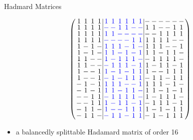 \documentclass{beamer}
\newcommand{\bblue}[1]{\textcolor{blue}{#1}}
\begin{document}
\begin{frame}{Hadmard Matrices}

  \[
    \arraycolsep=1.0pt\def\arraystretch{0.75}
    \left(\begin{array}{cccc|cccccc|cccccc}
            1&1&1&1&\bblue{1}&\bblue{1}&\bblue{1}&\bblue{1}&\bblue{1}&\bblue{1}&-&-&-&-&-&-\\
            1&1&1&1&\bblue{-}&\bblue{-}&\bblue{1}&\bblue{1}&\bblue{-}&\bblue{-}&1&1&-&-&1&1\\
            1&1&1&1&\bblue{1}&\bblue{1}&\bblue{-}&\bblue{-}&\bblue{-}&\bblue{-}&-&-&1&1&1&1\\
            1&1&1&1&\bblue{-}&\bblue{-}&\bblue{-}&\bblue{-}&\bblue{1}&\bblue{1}&1&1&1&1&-&-\\
            1&-&1&-&\bblue{1}&\bblue{1}&\bblue{1}&\bblue{-}&\bblue{1}&\bblue{-}&1&1&1&-&-&1\\
            1&-&1&-&\bblue{1}&\bblue{1}&\bblue{-}&\bblue{1}&\bblue{-}&\bblue{1}&1&1&-&1&1&-\\
            1&1&-&-&\bblue{1}&\bblue{-}&\bblue{1}&\bblue{1}&\bblue{1}&\bblue{-}&-&1&1&1&1&-\\
            1&1&-&-&\bblue{-}&\bblue{1}&\bblue{1}&\bblue{1}&\bblue{-}&\bblue{1}&1&-&1&1&-&1\\
            1&-&-&1&\bblue{1}&\bblue{-}&\bblue{1}&\bblue{-}&\bblue{1}&\bblue{1}&1&-&-&1&1&1\\
            1&-&-&1&\bblue{-}&\bblue{1}&\bblue{-}&\bblue{1}&\bblue{1}&\bblue{1}&-&1&1&-&1&1\\
            -&1&-&1&\bblue{1}&\bblue{1}&\bblue{1}&\bblue{-}&\bblue{-}&\bblue{1}&1&1&1&-&1&-\\
            -&1&-&1&\bblue{1}&\bblue{1}&\bblue{-}&\bblue{1}&\bblue{1}&\bblue{-}&1&1&-&1&-&1\\
            -&-&1&1&\bblue{-}&\bblue{1}&\bblue{1}&\bblue{1}&\bblue{1}&\bblue{-}&1&-&1&1&1&-\\
            -&-&1&1&\bblue{1}&\bblue{-}&\bblue{1}&\bblue{1}&\bblue{-}&\bblue{1}&-&1&1&1&-&1\\
            -&1&1&-&\bblue{1}&\bblue{-}&\bblue{-}&\bblue{1}&\bblue{1}&\bblue{1}&1&-&1&-&1&1\\
            -&1&1&-&\bblue{-}&\bblue{1}&\bblue{1}&\bblue{-}&\bblue{1}&\bblue{1}&-&1&-&1&1&1\\
          \end{array}\right)
      \]

      \begin{itemize}
      \item a balancedly splittable Hadamard matrix of order 16
      \end{itemize}

\end{frame}
\end{document}
